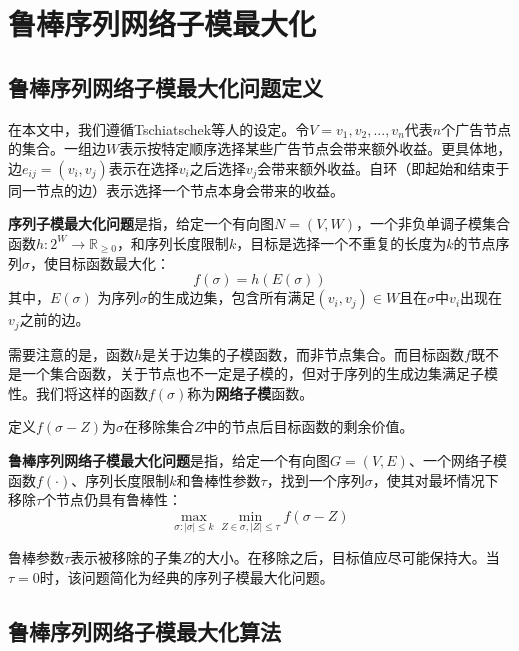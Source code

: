 \chapter{鲁棒序列网络子模最大化}

\section{鲁棒序列网络子模最大化问题定义}
\label{sec:3_1}
在本文中，我们遵循Tschiatschek等人\cite{tschiatschek2017selecting}的设定。令$V={v_1,v_2,...,v_n}$代表$n$个广告节点的集合。一组边\(W\)表示按特定顺序选择某些广告节点会带来额外收益。更具体地，边\(e_{ij} = (v_i,v_j)\)表示在选择\(v_i\)之后选择\(v_j\)会带来额外收益。自环（即起始和结束于同一节点的边）表示选择一个节点本身会带来的收益。

\begin{definition}
{\bfseries 序列子模最大化问题}是指，给定一个有向图\(N = (V,W)\)，一个非负单调子模集合函数\(h: 2^W \rightarrow \mathbb{R}_{\ge 0}\)，和序列长度限制\(k\)，目标是选择一个不重复的长度为\(k\)的节点序列\(\sigma\)，使目标函数最大化：
\begin{equation}
    f(\sigma)=h(E(\sigma))
\end{equation}
\noindent 其中，\(E(\sigma)\) 为序列$\sigma$的生成边集，包含所有满足\((v_i,v_j)\in W\)且在\(\sigma\)中\(v_i\)出现在\(v_j\)之前的边。
\end{definition}

需要注意的是，函数\(h\)是关于边集的子模函数，而非节点集合。而目标函数\(f\)既不是一个集合函数，关于节点也不一定是子模的，但对于序列的生成边集满足子模性。我们将这样的函数\(f(\sigma)\)称为{\bfseries 网络子模}函数。

定义\(f(\sigma - Z)\)为$\sigma$在移除集合\(Z\)中的节点后目标函数的剩余价值。
\begin{definition}
{\bfseries 鲁棒序列网络子模最大化问题}是指，给定一个有向图\(G=(V,E)\)、一个网络子模函数\(f(\cdot)\)、序列长度限制$k$和鲁棒性参数\(\tau\)，找到一个序列\(\sigma\)，使其对最坏情况下移除\(\tau\)个节点仍具有鲁棒性：
\begin{equation}
    \max_{\sigma:|\sigma|\le k} \min_{Z\in \sigma,|Z|\le \tau} f(\sigma - Z)
\end{equation}
\end{definition}

鲁棒参数\(\tau\)表示被移除的子集\(Z\)的大小。在移除之后，目标值应尽可能保持大。当\(\tau = 0\)时，该问题简化为经典的序列子模最大化问题\cite{mitrovic2018submodularity}。

\section{鲁棒序列网络子模最大化算法}
\label{sec:3_2}


